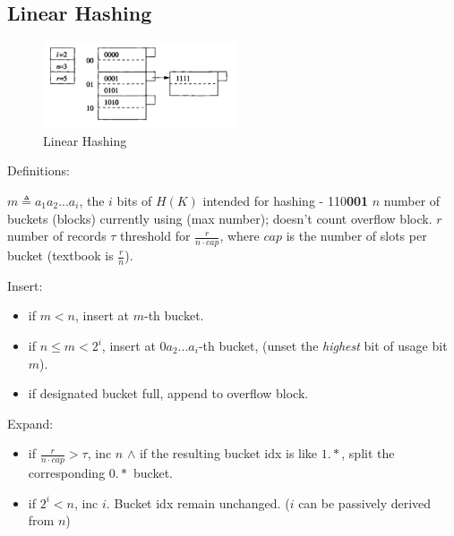 \documentclass[a4paper]{report}
\begin{document}
\subsection{Linear Hashing}
\begin{figure}[H]
        \centerline{\includegraphics[height = 1in]{img/linearhashing}}
        \caption{Linear Hashing}
    \label{fig:linearHashing}
\end{figure}
Definitions:
\begin{itemize}
\treeitem $m \triangleq a_1a_2...a_i$, the $i$  bits of $H(K)$ intended for hashing - 110\textbf{001}
\treeitem $n$ number of buckets (blocks) currently using (max number); doesn't count overflow block. 
\treeitem $r$ number of records
\treeitem $\tau$ threshold for $\frac{r}{n\cdot cap}$, where $cap$ is the number of slots per bucket (textbook is $\frac{r}{n}$).
\end{itemize}
Insert: 
\begin{itemize}
\item if $m<n$, insert at $m$-th bucket.
\item if $n\leq m < 2^i$, insert at $0a_2...a_i$-th bucket, (unset the \textit{highest} bit of usage bit $m$).
\item if designated bucket full, append to overflow block. 
\end{itemize}
Expand:
\begin{itemize}
\item if $\frac{r}{n\cdot cap}>\tau$, inc $n$ $\wedge$ if the resulting bucket idx is like $1.*$, split the corresponding $0.*$ bucket. 
\item if $2^i<n$, inc $i$. Bucket idx remain unchanged. ($i$ can be passively derived from $n$) 
\end{itemize}
\end{document}
